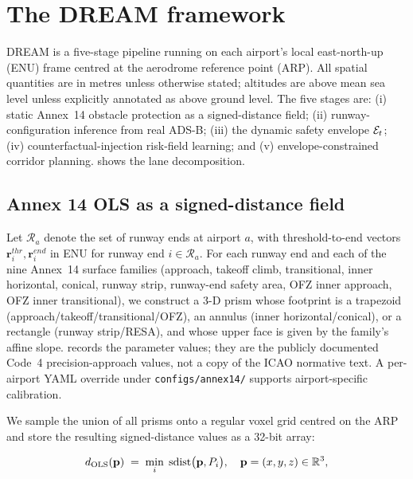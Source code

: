\section{The DREAM framework}
\label{sec:method}



DREAM is a five-stage pipeline running on each airport's local
east-north-up (ENU) frame centred at the aerodrome reference point (ARP).
All spatial quantities are in metres unless otherwise stated; altitudes are
above mean sea level unless explicitly annotated as above ground level. The
five stages are: (i) static Annex~14 obstacle protection as a signed-distance
field; (ii) runway-configuration inference from real ADS-B; (iii) the dynamic
safety envelope $\mathcal{E}_t$; (iv) counterfactual-injection risk-field learning;
and (v) envelope-constrained corridor planning. 
shows the lane decomposition.

\subsection{Annex 14 OLS as a signed-distance field}
\label{sec:method-sdf}

Let $\mathcal{R}_a$ denote the set of runway ends at airport $a$, with
threshold-to-end vectors $\mathbf{r}^{thr}_{i}, \mathbf{r}^{end}_{i}$
in ENU for runway end $i \in \mathcal{R}_a$. For each runway end and each of
the nine Annex~14 surface families (approach, takeoff climb, transitional,
inner horizontal, conical, runway strip, runway-end safety area, OFZ inner
approach, OFZ inner transitional), we construct a 3-D prism whose footprint
is a trapezoid (approach/takeoff/transitional/OFZ), an annulus
(inner horizontal/conical), or a rectangle (runway strip/RESA), and whose
upper face is given by the family's affine slope. 
records the parameter values; they are the publicly documented Code~4
precision-approach values, not a copy of the ICAO normative text. A
per-airport YAML override under \texttt{configs/annex14/} supports
airport-specific calibration.

We sample the union of all prisms onto a regular voxel grid centred on the
ARP and store the resulting signed-distance values as a 32-bit array:

\begin{equation}
d_{\mathrm{OLS}}(\mathbf{p}) \;=\; \min_{i}\; \mathrm{sdist}\bigl(\mathbf{p}, P_i\bigr),
\quad
\mathbf{p}=(x,y,z) \in \mathbb{R}^3,
\label{eq:sdf}
\end{equation}

